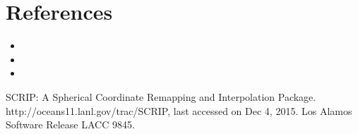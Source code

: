 \documentclass[letterpaper,10pt,english]{sphinxmanual}
\begin{document}
\section{References}
\label{\detokenize{appendix:references}}

\begin{itemize}
\item {} 

\item {} 

\item {} 

\end{itemize}

\begin{sphinxthebibliography}{1}
SCRIP: A Spherical Coordinate Remapping and Interpolation Package. http://oceans11.lanl.gov/trac/SCRIP, last accessed on Dec 4, 2015. Los Alamos Software Release LACC 98\sphinxhyphen{}45.
\end{sphinxthebibliography}


\renewcommand{\indexname}{Python Module Index}
\begin{sphinxtheindex}
\let\bigletter\sphinxstyleindexlettergroup
\bigletter{e}
\item\relax{}
\end{sphinxtheindex}

\renewcommand{\indexname}{Index}
\printindex
\end{document}
